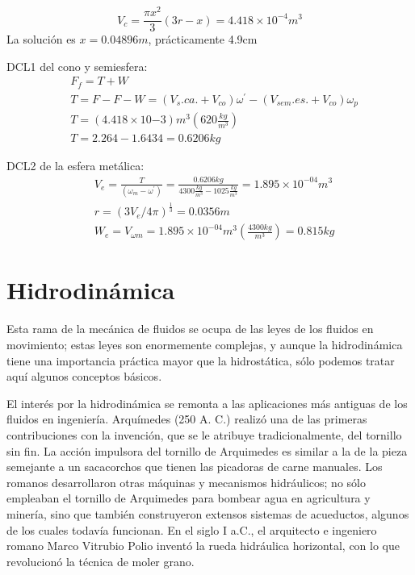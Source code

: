 \begin{equation*}
    V_c=\frac{\pi x^2}{3}(3r-x)=4.418\times 10^{-4}m^3
\end{equation*}
La solución es $x=0.04896m$, prácticamente 4.9cm

DCL1 del cono y semiesfera:
\begin{align*}
    &F_f=T+W\\
    &T=F-F-W=\left(V_s.ca.+V_{co}\right)\omega^{\prime}-\left(V_{sem}.es.+V_{co}\right)\omega_p\\
    &T=\left(4.418\times 10{-3}\right)m^3\left(620\frac{kg}{m^3}\right)\\
    &T=2.264-1.6434=0.6206kg
\end{align*}

DCL2 de la esfera metálica:
\begin{align*}
    &V_e=\frac{T}{\left(\omega_m-\omega^{\prime}\right)}=\frac{0.6206kg}{4300\frac{kg}{m^3}-1025\frac{kg}{m^3}}=1.895\times 10^{-04}m^3\\
    &r=\left(3V_e/4\pi\right)^{\frac{1}{3}}=0.0356m\\
    &W_e=V_{\omega m}=1.895\times 10^{-04}m^3\left(\frac{4300kg}{m^3}\right)=0.815kg
\end{align*}

\section{Hidrodinámica}

Esta rama de la mecánica de fluidos se ocupa de las leyes de los fluidos en movimiento; estas leyes son enormemente complejas, y aunque la hidrodinámica tiene una importancia práctica mayor que la hidrostática, sólo podemos tratar aquí algunos conceptos básicos.

El interés por la hidrodinámica se remonta a las aplicaciones más antiguas de los fluidos en ingeniería. Arquímedes (250 A. C.) realizó una de las primeras contribuciones con la invención, que se le atribuye tradicionalmente, del tornillo sin fin. La acción impulsora del tornillo de Arquimedes es similar a la de la pieza semejante a un sacacorchos que tienen las picadoras de carne manuales. Los romanos desarrollaron otras máquinas y mecanismos hidráulicos; no sólo empleaban el tornillo de Arquimedes para bombear agua en agricultura y minería, sino que también construyeron extensos sistemas de acueductos, algunos de los cuales todavía funcionan. En el siglo I a.C., el arquitecto e ingeniero romano Marco Vitrubio Polio inventó la rueda hidráulica horizontal, con lo que revolucionó la técnica de moler grano.

